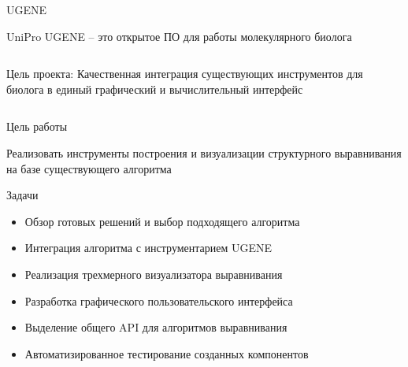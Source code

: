 \documentclass[utf8, professionalfonts]{beamer}
\begin{document}
\begin{frame}{UGENE}
\begin{center}
\Large{UniPro UGENE -- это открытое ПО для работы молекулярного биолога}
\end{center}

\begin{columns}
	
	Цель проекта: Качественная интеграция существующих инструментов для биолога в единый графический и вычислительный интерфейс
	
\end{columns}
\end{frame}



\begin{frame}{Цель работы}
\begin{center}
\Large Реализовать инструменты построения и визуализации структурного выравнивания на базе существующего алгоритма
\end{center}
\vspace{11pt}
Задачи
\begin{itemize}
    \item Обзор готовых решений и выбор подходящего алгоритма
    \item Интеграция алгоритма с инструментарием UGENE
    \item Реализация трехмерного визуализатора выравнивания
    \item Разработка графического пользовательского интерфейса
    \item Выделение общего API для алгоритмов выравнивания   
    \item Автоматизированное тестирование созданных компонентов
\end{itemize}
\end{frame}
\end{document}
